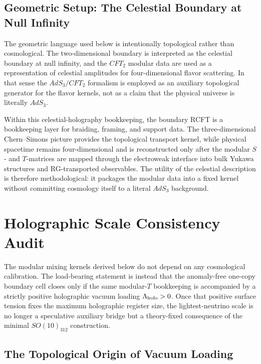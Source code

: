 \documentclass[11pt]{article}
\begin{document}
\subsection{Geometric Setup: The Celestial Boundary at Null Infinity}

The geometric language used below is intentionally topological rather than cosmological. The two-dimensional boundary is interpreted as the celestial boundary at null infinity, and the $CFT_2$ modular data are used as a representation of celestial amplitudes for four-dimensional flavor scattering. In that sense the $AdS_3/CFT_2$ formalism is employed as an auxiliary topological generator for the flavor kernels, not as a claim that the physical universe is literally $AdS_3$.

Within this celestial-holography bookkeeping, the boundary RCFT is a bookkeeping layer for braiding, framing, and support data. The three-dimensional Chern--Simons picture provides the topological transport kernel, while physical spacetime remains four-dimensional and is reconstructed only after the modular $S$- and $T$-matrices are mapped through the electroweak interface into bulk Yukawa structures and RG-transported observables. The utility of the celestial description is therefore methodological: it packages the modular data into a fixed kernel without committing cosmology itself to a literal $AdS_3$ background.

\section{Holographic Scale Consistency Audit}

The modular mixing kernels derived below do not depend on any cosmological calibration.
The load-bearing statement is instead that the anomaly-free one-copy boundary
cell closes only if the same modular-$T$ bookkeeping is accompanied by a
strictly positive holographic vacuum loading $\Lambda_{\rm holo}>0$. Once that
positive surface tension fixes the maximum holographic register size, the
lightest-neutrino scale is no longer a speculative auxiliary bridge but a
theory-fixed consequence of the minimal $SO(10)_{312}$ construction.

\subsection{The Topological Origin of Vacuum Loading}
\end{document}
